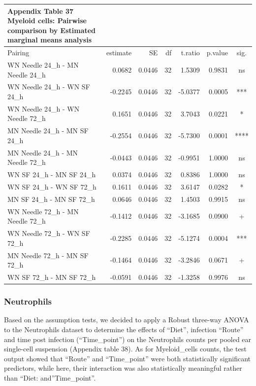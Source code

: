 \documentclass[
  12pt,
  letterpaper,
]{article}
\begin{document}
\begingroup
\fontsize{12.0pt}{14.4pt}\selectfont
\begin{longtable}{l|rrrrrc}
\caption*{
{\large \textbf{Appendix Table 37}} \\ 
{\small \textbf{Myeloid cells: Pairwise comparison by Estimated marginal means analysis}}
} \\ 
\toprule
Pairing & estimate & SE & df & t.ratio & p.value & sig. \\ 
\midrule\addlinespace[2.5pt]
WN Needle 24\_h - MN Needle 24\_h & 0.0682 & 0.0446 & 32 & 1.5309 & 0.9831 & ns \\ 
WN Needle 24\_h - WN SF 24\_h & -0.2245 & 0.0446 & 32 & -5.0377 & 0.0005 & *** \\ 
WN Needle 24\_h - WN Needle 72\_h & 0.1651 & 0.0446 & 32 & 3.7043 & 0.0221 & * \\ 
MN Needle 24\_h - MN SF 24\_h & -0.2554 & 0.0446 & 32 & -5.7300 & 0.0001 & **** \\ 
MN Needle 24\_h - MN Needle 72\_h & -0.0443 & 0.0446 & 32 & -0.9951 & 1.0000 & ns \\ 
WN SF 24\_h - MN SF 24\_h & 0.0374 & 0.0446 & 32 & 0.8386 & 1.0000 & ns \\ 
WN SF 24\_h - WN SF 72\_h & 0.1611 & 0.0446 & 32 & 3.6147 & 0.0282 & * \\ 
MN SF 24\_h - MN SF 72\_h & 0.0646 & 0.0446 & 32 & 1.4503 & 0.9915 & ns \\ 
WN Needle 72\_h - MN Needle 72\_h & -0.1412 & 0.0446 & 32 & -3.1685 & 0.0900 & + \\ 
WN Needle 72\_h - WN SF 72\_h & -0.2285 & 0.0446 & 32 & -5.1274 & 0.0004 & *** \\ 
MN Needle 72\_h - MN SF 72\_h & -0.1464 & 0.0446 & 32 & -3.2846 & 0.0671 & + \\ 
WN SF 72\_h - MN SF 72\_h & -0.0591 & 0.0446 & 32 & -1.3258 & 0.9976 & ns \\ 
\bottomrule
\end{longtable}
\endgroup

\subsubsection{Neutrophils}\label{neutrophils-3}

Based on the assumption tests, we decided to apply a Robust three-way ANOVA to the Neutrophils dataset to determine the effects of ``Diet'', infection ``Route'' and time post infection (``Time\_point'') on the Neutrophils counts per pooled ear single-cell suspension (Appendix table 38). As for Myeloid\_cells counts, the test output showed that ``Route'' and ``Time\_point'' were both statistically significant predictors, while here, their interaction was also statistically meaningful rather than ``Diet: and''Time\_point''.
\end{document}
